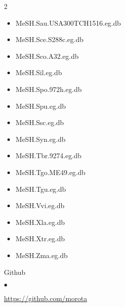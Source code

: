 \documentclass[margin,line,10pt]{res}
\newenvironment{list1}{
  \begin{list}{\ding{113}}{%
      \setlength{\itemsep}{0in}
      \setlength{\parsep}{0in} \setlength{\parskip}{0in}
      \setlength{\topsep}{0in} \setlength{\partopsep}{0in} 
      \setlength{\leftmargin}{0.17in}}}{\end{list}}
\newenvironment{list2}{
  \begin{list}{$\bullet$}{%
      \setlength{\itemsep}{0in}
      \setlength{\parsep}{0in} \setlength{\parskip}{0in}
      \setlength{\topsep}{0in} \setlength{\partopsep}{0in} 
      \setlength{\leftmargin}{0.2in}}}{\end{list}}
\begin{document}
\begin{resume}
\begin{list1}
\begin{multicols}{2}
\begin{itemize}
\item MeSH.Sau.USA300TCH1516.eg.db 
\item MeSH.Sce.S288c.eg.db 
\item MeSH.Sco.A32.eg.db 
\item MeSH.Sil.eg.db 
\item MeSH.Spo.972h.eg.db
\item MeSH.Spu.eg.db
\item MeSH.Ssc.eg.db 
\item MeSH.Syn.eg.db 
\item MeSH.Tbr.9274.eg.db 
\item MeSH.Tgo.ME49.eg.db
\item MeSH.Tgu.eg.db 
\item MeSH.Vvi.eg.db 
\item MeSH.Xla.eg.db  
\item MeSH.Xtr.eg.db 
\item MeSH.Zma.eg.db
\end{itemize}
\end{multicols}



\vspace{0.3cm}
\item[] Github
\begin{list2}
\item \textcolor{blue}{\href{https://github.com/morota}{https://github.com/morota}} 
\end{list2}
\end{list1}










\end{resume}
\end{document}
